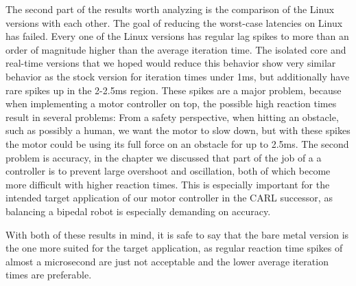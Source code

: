 The second part of the results worth analyzing is the comparison of the Linux versions with each other.
The goal of reducing the worst-case latencies on Linux has failed.
Every one of the Linux versions has regular lag spikes to more than an order of magnitude higher than the average iteration time.
The isolated core and real-time versions that we hoped would reduce this behavior show very similar behavior as the stock version for iteration times under 1ms,
but additionally have rare spikes up in the 2-2.5ms region.
These spikes are a major problem, because when implementing a motor controller on top, the possible high reaction times result in several problems:
From a safety perspective, when hitting an obstacle, such as possibly a human, we want the motor to slow down,
but with these spikes the motor could be using its full force on an obstacle for up to 2.5ms.
The second problem is accuracy, in the  chapter we discussed that part of the job of a a controller is to prevent large overshoot and oscillation,
both of which become more difficult with higher reaction times.
This is especially important for the intended target application of our motor controller in the CARL \cite[]{CARL} successor,
as balancing a bipedal robot is especially demanding on accuracy.

With both of these results in mind, it is safe to say that the bare metal version is the one more suited for the target application,
as regular reaction time spikes of almost a microsecond are just not acceptable and the lower average iteration times are preferable.
